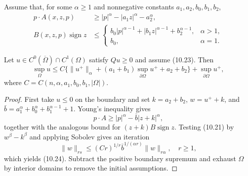 Assume that, for some $\alpha\ge1$ and nonnegative constants
$a_1,a_2,b_0,b_1,b_2$,
\begin{equation}
\begin{aligned}
p\cdot A(x,z,p)&\ge|p|^\alpha-|a_1z|^\alpha-a_2^\alpha,\\
B(x,z,p)\operatorname{sign}z&\le
\begin{cases}
b_0|p|^{\alpha-1}+|b_1z|^{\alpha-1}+b_2^{\alpha-1},&\alpha>1,\\
b_0,&\alpha=1.
\end{cases}
\end{aligned}
\tag{10.23}
\end{equation}

\begin{lemma}
\label{gilbarg-trudinger.lem.10.8.divergence-form-maximum-bound}
Let $u\in C^0(\overline\Omega)\cap C^1(\Omega)$ satisfy $Qu\ge0$ and
assume \textup{(10.23)}.  Then
\begin{equation}
\sup_\Omega u\le C\{\|u^+\|_\alpha
+(a_1+b_1)\sup_{\partial\Omega}u^++a_2+b_2\}
+\sup_{\partial\Omega}u^+,
\tag{10.24}
\end{equation}
where $C=C(n,\alpha,a_1,b_0,b_1,|\Omega|)$.
\end{lemma}
\begin{proof}
\sketch First take $u\le0$ on the boundary and set
$k=a_2+b_2$, $w=u^++k$, and
$\bar b=a_1^\alpha+b_0^\alpha+b_1^{\alpha-1}+1$.  Young's inequality
gives
\begin{equation}
p\cdot A\ge|p|^\alpha-\bar b|z+k|^\alpha,
\tag{10.25}
\end{equation}
together with the analogous bound for $(z+k)B\operatorname{sign}z$.
Testing \textup{(10.21)} by $w^\beta-k^\beta$ and applying Sobolev gives
an iteration
\[
\|w\|_{rs}\le(Cr)^{1/r}\bar b^{1/(\alpha r)}\|w\|_{r\alpha},
\quad r\ge1,
\]
which yields \textup{(10.24)}.  Subtract the positive boundary supremum
and exhaust $\Omega$ by interior domains to remove the initial assumptions.
\end{proof}

